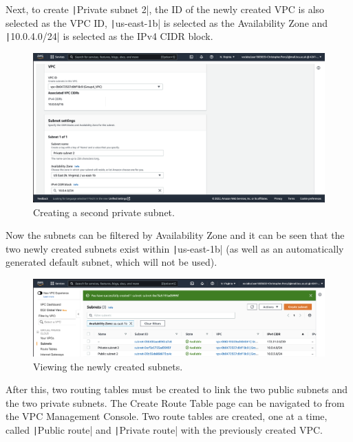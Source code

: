 Next, to create \texttt|Private subnet 2|, the ID of the newly created VPC is also selected as the VPC ID,
\texttt|us-east-1b| is selected as the Availability Zone and \texttt|10.0.4.0/24| is selected as the
IPv4 CIDR block.

\begin{figure}[!htbp]
    \centering
    \includegraphics[width=125mm]{resources/vpc/routes/vpc-private-subnet-2}
    \caption{Creating a second private subnet.}
    \label{fig:vpc-private-subnet-2}
\end{figure}

Now the subnets can be filtered by Availability Zone and it can be seen that the two newly created subnets exist within
\texttt|us-east-1b| (as well as an automatically generated default subnet, which will not be used).

\begin{figure}[!htbp]
    \centering
    \includegraphics[width=150mm]{resources/vpc/routes/vpc-subnets-2}
    \caption{Viewing the newly created subnets.}
    \label{fig:vpc-subnets-2}
\end{figure}

After this, two routing tables must be created to link the two public subnets and the two private subnets.
The Create Route Table page can be navigated to from the VPC Management Console.
Two route tables are created, one at a time, called \texttt|Public route| and \texttt|Private route|
with the previously created VPC\@.

